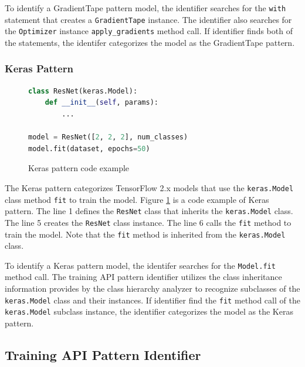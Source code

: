 To identify a GradientTape pattern model,
the identifier searches for the {\tt with} statement that creates a
{\tt GradientTape} instance.
The identifier also searches for the {\tt Optimizer} instance 
{\tt apply\_gradients} method call.
If identifier finds both of the statements, the identifer categorizes the
model as the GradientTape pattern.


\subsubsection{Keras Pattern}

\begin{figure}[ht!]
  \begin{lstlisting}[language=Python]
class ResNet(keras.Model):
    def __init__(self, params):
        ...

model = ResNet([2, 2, 2], num_classes)
model.fit(dataset, epochs=50)\end{lstlisting}
 
  \caption{Keras pattern code example}
  \label{fig:keraspattern}
\end{figure}

The Keras pattern categorizes TensorFlow 2.x models that use
the {\tt keras.Model} class method {\tt fit} to train the model. 
Figure \ref{fig:keraspattern} is a code example of Keras pattern.
The line 1 defines the {\tt ResNet} class that inherits the 
{\tt keras.Model} class. 
The line 5 creates the {\tt ResNet} class instance.
The line 6 calls the {\tt fit} method to train the model.
Note that the {\tt fit} method is inherited from the {\tt keras.Model} class.

To identify a Keras pattern model, the identifer searches for the
{\tt Model.fit} method call. The training API pattern identifier utilizes the
class inheritance information provides by the class hierarchy analyzer to
recognize subclasses of the {\tt keras.Model} class and their instances.
If identifier find the {\tt fit} method call of the {\tt keras.Model} subclass
instance, the identifier categorizes the model as the Keras pattern.

\subsection{Training API Pattern Identifier}

